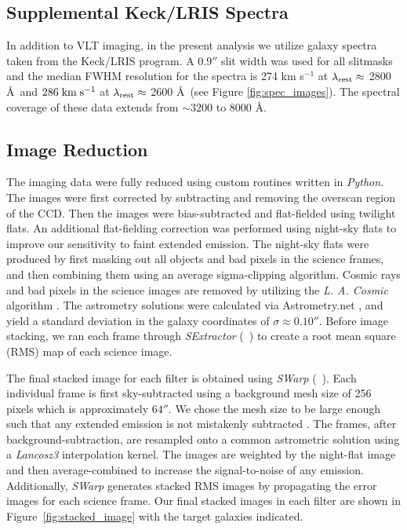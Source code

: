 \documentclass[twocolumn]{aastex62}
\newcommand{\citeth}[1]{(\citeauthor{#1}\ \citeyear{#1})}
\def \mkms {{\rm \; km\;s^{-1}}}
\begin{document}
\subsection{Supplemental Keck/LRIS Spectra}
In addition to VLT imaging, in the present analysis we utilize galaxy spectra taken from the \cite{Rubin_2014} Keck/LRIS program.  A $0.9''$ slit width was used for all slitmasks and the median FWHM resolution for the spectra is 274 km s$^{-1}$ at $\lambda_{\rm rest} \approx$ 2800 \AA\ and $286\mkms$  at $\lambda_{\rm rest}\approx$ 2600 \AA\ (see Figure \ref{fig:spec_images}).  The spectral coverage of these data extends from ${\sim}3200$ to 8000 \AA.

\subsection{Image Reduction}
The imaging data were fully reduced using custom routines written in \emph{Python}. 
The images were first corrected by subtracting and removing the overscan region of the CCD. 
Then the images were bias-subtracted and flat-fielded using twilight flats.
An additional flat-fielding correction was performed using night-sky flats to improve our sensitivity to faint extended emission.  The night-sky flats were produced by first masking out all objects and bad pixels in the science frames, and then combining them using an average sigma-clipping algorithm.
Cosmic rays and bad pixels in the science images are removed by utilizing the \emph{L. A. Cosmic} algorithm \citep{Dokkum2001}.
The astrometry solutions were calculated via Astrometry.net \citep{Lang}, and yield a standard deviation in the galaxy coordinates of $\sigma \approx 0.10''$. Before image stacking, we ran each frame through \emph{SExtractor} \citeth{Bertin} to create a root mean square (RMS) map of each science image.


The final stacked image for each filter is obtained using \emph{SWarp} \citeth{Bertin}.
Each individual frame is first sky-subtracted using a background mesh size of 256 pixels which is approximately $64''$. 
We chose the mesh size to be large enough such that any extended emission is not mistakenly subtracted \citep[e.g.,][]{Battaia_2015}. 
The frames, after background-subtraction, are resampled onto a common astrometric solution using a \textit{Lancosz3} interpolation kernel. 
The images are weighted by the night-flat image and then  average-combined to increase the signal-to-noise of any  emission. Additionally, \emph{SWarp} generates stacked RMS images by propagating the error images for each science frame.
Our final stacked images in each filter are shown in Figure~\ref{fig:stacked_image} with the target galaxies indicated.  
\end{document}
